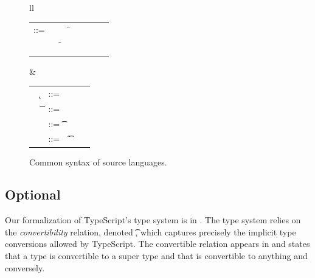 \documentclass[runnningheads]{tex/llncs}
\begin{document}
\begin{figure}[!h]\hrulefill
	\vspace{2mm}  \small
	
	\begin{tabular}{ll}
		\begin{minipage}{6cm}\begin{tabular}{@{}l@{~}l@{}l@{}l@{}l@{}l@{}l@{}l}
				\e\hspace{.1cm} ::= & \hspace{.2cm} \x        
				&\B \this         
				&\B \FRead\f \\    
				&
				&\B \FWrite\f\e
				&\B \Call\e\m\e \\
				& 
				&\B \that      
				&\B \New\C{\e[1]..}  
		\end{tabular}\end{minipage}&
		\begin{minipage}{5cm}\begin{tabular}{l@{~}l@{}l@{}l}
				~ \k &::= \Class \C {\fd[1]..}{\md[1]..} \\
				~ \t&::= ~ \any  \B   \C \\ 
				\md &::= \Mdef\m\x\t\t\e \\
				~\fd&::= ~ \Fdef\f\t \\ 
		\end{tabular}\end{minipage} 
	\end{tabular}
	\vspace{2mm} 
\caption{Common syntax of source languages.}\label{f:sourcesyntax2}
\end{figure}

\subsection{Optional}

Our formalization of TypeScript's type system is in
. The type system relies on the \emph{convertibility}
relation, denoted \ConvertE{}\t\tp, which captures precisely the implicit
type conversions allowed by TypeScript.  The convertible relation appears in
 and states that a type is convertible to a super type and
that \any is convertible to anything and conversely. 
\end{document}
